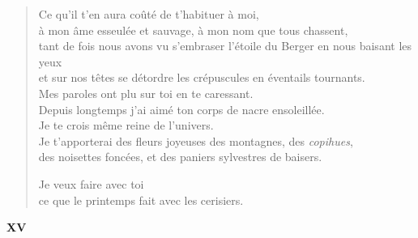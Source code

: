 \documentclass[11pt,a4paper]{book}
\begin{document}
\begin{verse}
  Ce qu'il t'en aura coûté de t'habituer à moi, \\
  à mon âme esseulée et sauvage, à mon nom que tous chassent, \\
  tant de fois nous avons vu s'embraser l'étoile du Berger en nous baisant les yeux \\
  et sur nos têtes se détordre les crépuscules en éventails tournants. \\
  Mes paroles ont plu sur toi en te caressant. \\
  Depuis longtemps j'ai aimé ton corps de nacre ensoleillée. \\
  Je te crois même reine de l'univers. \\
  Je t'apporterai des fleurs joyeuses des montagnes, des \emph{copihues}, \\
  des noisettes foncées, et des paniers sylvestres de baisers.

  Je veux faire avec toi \\
  ce que le printemps fait avec les cerisiers.
\end{verse}

\newpage


\begin{center} \textbf{XV} \end{center}

\bigskip
\end{document}
